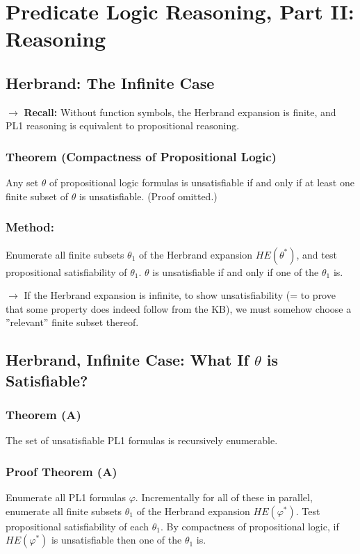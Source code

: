 \documentclass[conference, a4paper]{styles/acmsiggraph}
\begin{document}
    
    
    
\section{Predicate Logic Reasoning, Part II: Reasoning}
    \subsection{Herbrand: The Infinite Case}
        $\rightarrow$ \textbf{Recall:} Without function symbols, the Herbrand expansion is finite, and PL1 reasoning is equivalent to propositional reasoning.
        
        \subsubsection{Theorem (Compactness of Propositional Logic)}
            Any set $\theta$ of propositional logic formulas is unsatisfiable if and only if at least one finite subset of $\theta$ is unsatisfiable. (Proof omitted.)
        
        \subsubsection{Method:}
            Enumerate all finite subsets $\theta_1$ of the Herbrand expansion $HE(\theta^*)$, and test propositional satisfiability of $\theta_1$.
            $\theta$ is unsatisfiable if and only if one of the $\theta_1$ is.
        
        $\rightarrow$ If the Herbrand expansion is infinite, to show unsatisfiability (= to prove that some property does indeed follow from the KB), we must somehow choose a ''relevant'' finite subset thereof.
        
        
    \subsection{Herbrand, Infinite Case: What If $\theta$ is Satisfiable?}
        \subsubsection{Theorem (A)}
            The set of unsatisfiable PL1 formulas is recursively enumerable.
        
        \subsubsection{Proof Theorem (A)}
            Enumerate all PL1 formulas $\varphi$. 
            Incrementally for all of these in parallel, enumerate all finite subsets $\theta_1$ of the Herbrand expansion $HE(\varphi^*)$.
            Test propositional satisfiability of each $\theta_1$. 
            By compactness of propositional logic, if $HE(\varphi^*)$ is unsatisfiable then one of the $\theta_1$ is.
        
\end{document}
